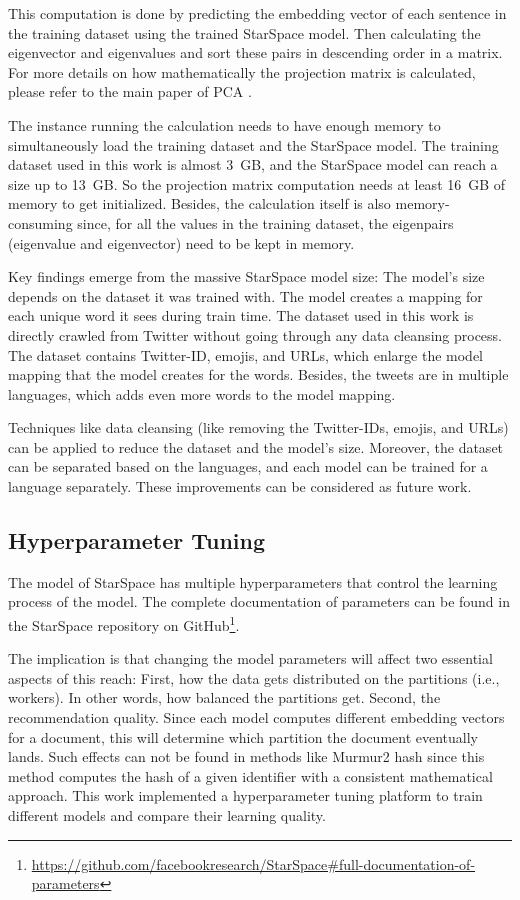This computation is done by predicting the embedding vector of each sentence in the training dataset using the trained StarSpace model. Then calculating the eigenvector and eigenvalues and sort these pairs in descending order in a matrix. For more details on how mathematically the projection matrix is calculated, please refer to the main paper of PCA \cite{woldPrincipalComponentAnalysis1987}.


The instance running the calculation needs to have enough memory to simultaneously load the training dataset and the StarSpace model. The training dataset used in this work is almost 3~GB, and the StarSpace model can reach a size up to 13~GB. So the projection matrix computation needs at least 16~GB of memory to get initialized. Besides, the calculation itself is also memory-consuming since, for all the values in the training dataset, the eigenpairs (eigenvalue and eigenvector) need to be kept in memory.


Key findings emerge from the massive StarSpace model size: The model's size depends on the dataset it was trained with. The model creates a mapping for each unique word it sees during train time. The dataset used in this work is directly crawled from Twitter without going through any data cleansing process. The dataset contains Twitter-ID, emojis, and URLs, which enlarge the model mapping that the model creates for the words. Besides, the tweets are in multiple languages, which adds even more words to the model mapping.


Techniques like data cleansing (like removing the Twitter-IDs, emojis, and URLs) can be applied to reduce the dataset and the model's size. Moreover, the dataset can be separated based on the languages, and each model can be trained for a language separately. These improvements can be considered as future work.


\subsection{Hyperparameter Tuning}
\label{subsec:hyperparameter-tuning}
The model of StarSpace has multiple hyperparameters that control the learning process of the model. The complete documentation of parameters can be found in the StarSpace repository on GitHub\footnote{\url{https://github.com/facebookresearch/StarSpace\#full-documentation-of-parameters}}. 


The implication is that changing the model parameters will affect two essential aspects of this reach: First, how the data gets distributed on the partitions (i.e., workers). In other words, how balanced the partitions get. Second, the recommendation quality. Since each model computes different embedding vectors for a document, this will determine which partition the document eventually lands. Such effects can not be found in methods like Murmur2 hash since this method computes the hash of a given identifier with a consistent mathematical approach. This work implemented a hyperparameter tuning platform to train different models and compare their learning quality.


